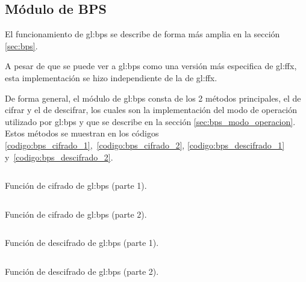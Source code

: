 %
%
%

%
\subsection{Módulo de BPS}

El funcionamiento de \gls{gl:bps} se describe de forma más amplia en la sección
\ref{sec:bps}.


A pesar de que se puede ver a \gls{gl:bps} como una versión más especifica de
\gls{gl:ffx}, esta implementación se hizo independiente de la de \gls{gl:ffx}.

De forma general, el módulo de \gls{gl:bps} consta de los 2 métodos principales,
el de cifrar y el de descifrar, los cuales son la implementación del modo de
operación utilizado por \gls{gl:bps} y que se describe en la sección
\ref{sec:bps_modo_operacion}. Estos métodos se muestran en los códigos
\ref{codigo:bps_cifrado_1},~\ref{codigo:bps_cifrado_2},
\ref{codigo:bps_descifrado_1} y~\ref{codigo:bps_descifrado_2}.


\begin{listing}
  \inputminted[firstline=77, lastline=116]
    {c++}{../implementaciones/bps/cifrador_BPS.cpp}
  \caption{Función de cifrado de \gls{gl:bps} (parte 1).}
  \label{codigo:bps_cifrado_1}
\end{listing}

\begin{listing}
  \inputminted[firstline=116, lastline=156]
    {c++}{../implementaciones/bps/cifrador_BPS.cpp}
  \caption{Función de cifrado de \gls{gl:bps} (parte 2).}
  \label{codigo:bps_cifrado_2}
\end{listing}

\begin{listing}
  \inputminted[firstline=158, lastline=198]
    {c++}{../implementaciones/bps/cifrador_BPS.cpp}
  \caption{Función de descifrado de \gls{gl:bps} (parte 1).}
  \label{codigo:bps_descifrado_1}
\end{listing}

\begin{listing}
  \inputminted[firstline=198, lastline=250]
    {c++}{../implementaciones/bps/cifrador_BPS.cpp}
  \caption{Función de descifrado de \gls{gl:bps} (parte 2).}
  \label{codigo:bps_descifrado_2}
\end{listing}

